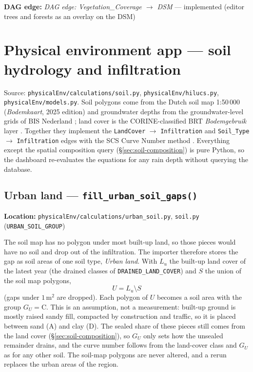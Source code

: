 \documentclass[11pt]{article}
\newcommand{\code}[1]{\texttt{#1}}
\newcommand{\dagedge}[1]{\textit{DAG edge: #1}}
\newcommand{\statusdone}{\textcolor{green!50!black}{implemented}}
\begin{document}
\textbf{DAG edge:} \dagedge{Vegetation\_Coverage $\rightarrow$ DSM} --- \statusdone{} (editor trees and forests as an overlay on the DSM)

\section{Physical environment app --- soil hydrology and infiltration}
\label{sec:physicalenv}

Source: \code{physicalEnv/calculations/soil.py}, \code{physicalEnv/hilucs.py}, \code{physicalEnv/models.py}. Soil polygons come from the Dutch soil map 1:50\,000 (\textit{Bodemkaart}, 2025 edition) and groundwater depths from the groundwater-level grids of BIS Nederland \cite{BISNederland}; land cover is the CORINE-classified BRT \textit{Bodemgebruik} layer \cite{CORINE}. Together they implement the \texttt{LandCover} $\to$ \texttt{Infiltration} and \texttt{Soil\_Type} $\to$ \texttt{Infiltration} edges with the SCS Curve Number method \cite{TR55,NEH630ch7,NEH630ch10}. Everything except the spatial composition query (\S\ref{sec:soil-composition}) is pure Python, so the dashboard re-evaluates the equations for any rain depth without querying the database.

\subsection{Urban land --- \code{fill\_urban\_soil\_gaps()}}
\textbf{Location:} \code{physicalEnv/calculations/urban\_soil.py}, \code{soil.py} (\code{URBAN\_SOIL\_GROUP})

The soil map has no polygon under most built-up land, so those pieces would have no soil and drop out of the infiltration. The importer therefore stores the gap as soil areas of one soil type, \textit{Urban land}. With $L_u$ the built-up land cover of the latest year (the drained classes of \code{DRAINED\_LAND\_COVER}) and $S$ the union of the soil map polygons,
\begin{equation}
  U = L_u \setminus S
\end{equation}
(gaps under $1\,\mathrm{m^2}$ are dropped). Each polygon of $U$ becomes a soil area with the group $G_U = \mathrm{C}$. This is an assumption, not a measurement: built-up ground is mostly raised sandy fill, compacted by construction and traffic, so it is placed between sand (A) and clay (D). The sealed share of these pieces still comes from the land cover (\S\ref{sec:soil-composition}), so $G_U$ only sets how the unsealed remainder drains, and the curve number follows from the land-cover class and $G_U$ as for any other soil. The soil-map polygons are never altered, and a rerun replaces the urban areas of the region.
\end{document}
